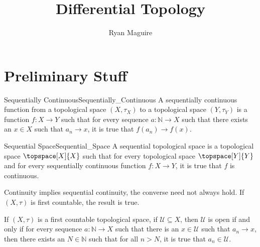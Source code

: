 \documentclass{article}                                                        %
\begin{document}
    \title{Differential Topology}
    \author{Ryan Maguire}
    \date{\vspace{-5ex}}
    \maketitle
    \section{Preliminary Stuff}
        \begin{fdefinition}{Sequentially Continuous}{Sequentially_Continuous}
            A sequentially continuous function from a topological space
            $(X,\tau_{X})$ to a topological space $(Y,\tau_{Y})$ is a
            function $f:X\rightarrow{Y}$ such that for every sequence
            $a:\mathbb{N}\rightarrow{X}$ such that there exists an $x\in{X}$
            such that $a_{n}\rightarrow{x}$, it is true that
            $f(a_{n})\rightarrow{f}(x)$.
        \end{fdefinition}
        \begin{fdefinition}{Sequential Space}{Sequential_Space}
            A sequential topological space is a topological space
            $\topspace[X]{X}$ such that for every topological space
            $\topspace[Y]{Y}$ and for every sequentially continuous function
            $f:X\rightarrow{Y}$, it is true that $f$ is continuous.
        \end{fdefinition}
        Continuity implies sequential continuity, the converse need not always
        hold. If $(X,\tau)$ is first countable, the result is true.
        \begin{theorem}
            If $(X,\tau)$ is a first countable topological space, if
            $\mathcal{U}\subseteq{X}$, then $\mathcal{U}$ is open if and only if
            for every sequence $a:\mathbb{N}\rightarrow{X}$ such that there is
            an $x\in\mathcal{U}$ such that $a_{n}\rightarrow{x}$, then there
            exists an $N\in\mathbb{N}$ such that for all $n>N$, it is true that
            $a_{n}\in\mathcal{U}$.
        \end{theorem}
\end{document}
